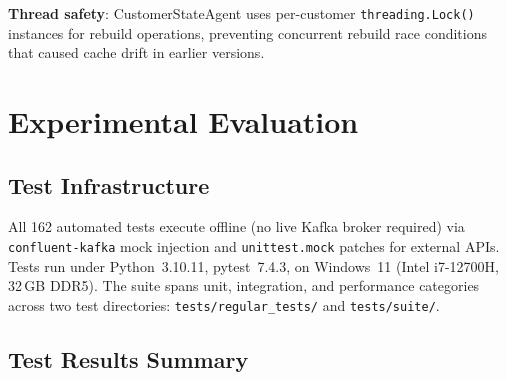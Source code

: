 ﻿\documentclass[runningheads]{llncs}
\begin{document}
\textbf{Thread safety}: CustomerStateAgent uses per-customer \texttt{threading.Lock()} instances for rebuild operations, preventing concurrent rebuild race conditions that caused cache drift in earlier versions.

\section{Experimental Evaluation}
\label{sec:eval}

\subsection{Test Infrastructure}

All 162 automated tests execute offline (no live Kafka broker required) via \texttt{confluent-kafka} mock injection and \texttt{unittest.mock} patches for external APIs. Tests run under Python~3.10.11, pytest~7.4.3, on Windows~11 (Intel i7-12700H, 32\,GB DDR5). The suite spans unit, integration, and performance categories across two test directories: \texttt{tests/regular\_tests/} and \texttt{tests/suite/}.

\subsection{Test Results Summary}
\end{document}
